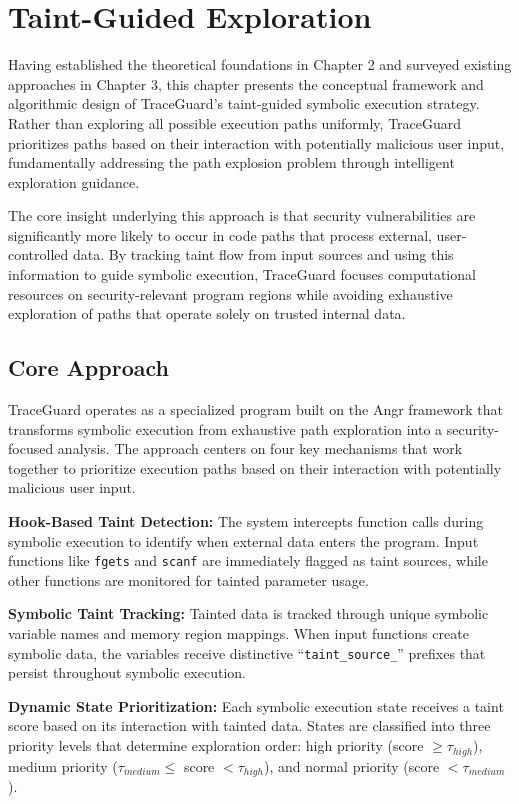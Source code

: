 \chapter{Taint-Guided Exploration}

Having established the theoretical foundations in Chapter 2 and surveyed existing approaches in Chapter 3, this chapter presents the conceptual framework and algorithmic design of TraceGuard's taint-guided symbolic execution strategy. Rather than exploring all possible execution paths uniformly, TraceGuard prioritizes paths based on their interaction with potentially malicious user input, fundamentally addressing the path explosion problem through intelligent exploration guidance.

The core insight underlying this approach is that security vulnerabilities are significantly more likely to occur in code paths that process external, user-controlled data. By tracking taint flow from input sources and using this information to guide symbolic execution, TraceGuard focuses computational resources on security-relevant program regions while avoiding exhaustive exploration of paths that operate solely on trusted internal data.

\section{Core Approach}

TraceGuard operates as a specialized program built on the Angr framework that transforms symbolic execution from exhaustive path exploration into a security-focused analysis. The approach centers on four key mechanisms that work together to prioritize execution paths based on their interaction with potentially malicious user input.

\textbf{Hook-Based Taint Detection:} The system intercepts function calls during symbolic execution to identify when external data enters the program. Input functions like \texttt{fgets} and \texttt{scanf} are immediately flagged as taint sources, while other functions are monitored for tainted parameter usage.

\textbf{Symbolic Taint Tracking:} Tainted data is tracked through unique symbolic variable names and memory region mappings. When input functions create symbolic data, the variables receive distinctive ``\texttt{taint\_source\_}'' prefixes that persist throughout symbolic execution.

\textbf{Dynamic State Prioritization:} Each symbolic execution state receives a taint score based on its interaction with tainted data. States are classified into three priority levels that determine exploration order: high priority (score $\geq \tau_{high}$), medium priority ($\tau_{medium} \leq$ score $< \tau_{high}$), and normal priority (score $< \tau_{medium}$).

